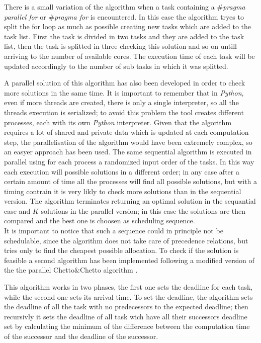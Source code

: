 \documentclass[a4paper,11pt,oneside]{book}
\begin{document}
There is a small variation of the algorithm when a task containing a \emph{$\#$pragma parallel for} or \emph{$\#$pragma  for} is encountered. In this case the algorithm tryes to split the for loop as much as possible creating new tasks which are added to the task list. First the task is divided in two tasks and they are added to the task list, then the task is splitted in three checking this solution and so on untill arriving to the number of available cores. The execution time of each task will be updated accordingly to the number of sub tasks in which it was splitted. 

A parallel solution of this algorithm has also been developed in order to check more solutions in the same time. It is important to remember that in \emph{Python}, even if more threads are created, there is only a single interpreter, so all the threads execution is serialized; to avoid this problem the tool creates different processes, each with its own \emph{Python} interpreter. Given that the algorithm requires a lot of shared and private data which is updated at each computation step, the parallelisation of the algorithm would have been extremely complex, so an easyer approach has been used. The same sequential algorithm is executed in parallel using for each process a randomized input order of the tasks. In this way each execution will possible solutions in a different order; in any case after a certain amount of time all the processes will find all possible solutions, but with a timing contrain it is very likly to check more solutions than in the sequential version. The algorithm terminates returning an optimal solution in the sequantial case and $K$ solutions in the parallel version; in this case the solutions are then compared and the best one is choosen as scheduling sequence. \\
It is important to notice that such a sequence could in principle not be schedulable, since the algorithm does not take care of precedence relations, but tries only to find the cheapest possible allocation. To check if the solution is feasible a second algorithm has been implemented following a modified version of the the parallel Chetto$\&$Chetto algorithm \cite{bbw2}.

This algorithm works in two phases, the first one sets the deadline for each task, while the second one sets its arrival time. To set the deadline, the algorithm sets the deadline of all the task with no predecessors to the expected deadline; then recursivly it sets the deadline of all task wich have all their successors deadline set by calculating the minimum of the difference between the computation time of the successor and the deadline of the successor. 
\end{document}
